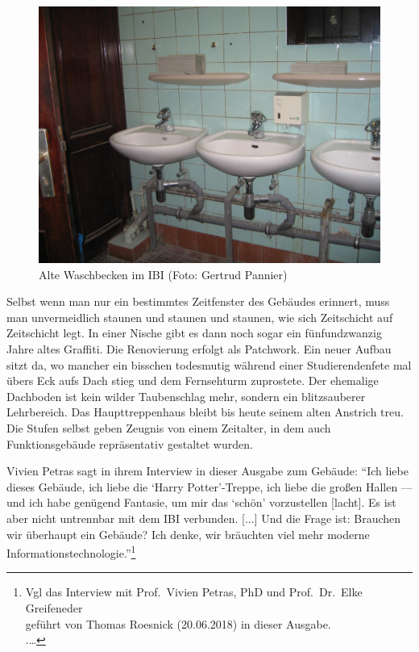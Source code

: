 \documentclass[a4paper,
fontsize=11pt,
oneside,
numbers=noperiodatend,
parskip=half-,
bibliography=totoc,
final
]{scrartcl}
\begin{document}
\begin{figure}
\centering
\includegraphics{img/waschen.jpg}
\caption{Alte Waschbecken im IBI (Foto: Gertrud Pannier)}
\end{figure}

Selbst wenn man nur ein bestimmtes Zeitfenster des Gebäudes erinnert,
muss man unvermeidlich staunen und staunen und staunen, wie sich
Zeitschicht auf Zeitschicht legt. In einer Nische gibt es dann noch
sogar ein fünfundzwanzig Jahre altes Graffiti. Die Renovierung erfolgt
als Patchwork. Ein neuer Aufbau sitzt da, wo mancher ein bisschen
todesmutig während einer Studierendenfete mal übers Eck aufs Dach stieg
und dem Fernsehturm zuprostete. Der ehemalige Dachboden ist kein wilder
Taubenschlag mehr, sondern ein blitzsauberer Lehrbereich. Das
Haupttreppenhaus bleibt bis heute seinem alten Anstrich treu. Die Stufen
selbst geben Zeugnis von einem Zeitalter, in dem auch Funktionsgebäude
repräsentativ gestaltet wurden.

Vivien Petras sagt in ihrem Interview in dieser Ausgabe zum Gebäude:
\enquote{Ich liebe dieses Gebäude, ich liebe die \enquote{Harry
Potter}-Treppe, ich liebe die großen Hallen --- und ich habe genügend
Fantasie, um mir das \enquote{schön} vorzustellen {[}lacht{]}. Es ist
aber nicht untrennbar mit dem IBI verbunden. {[}...{]} Und die Frage
ist: Brauchen wir überhaupt ein {Gebäude}? Ich denke, wir bräuchten viel
mehr moderne Informationstechnologie.}\footnote{Vgl das Interview mit
  Prof.~Vivien Petras, PhD und Prof.~Dr.~Elke Greifeneder\\
  geführt von Thomas Roesnick (20.06.2018) in dieser Ausgabe.\\
  .\ldots{}}
\end{document}
